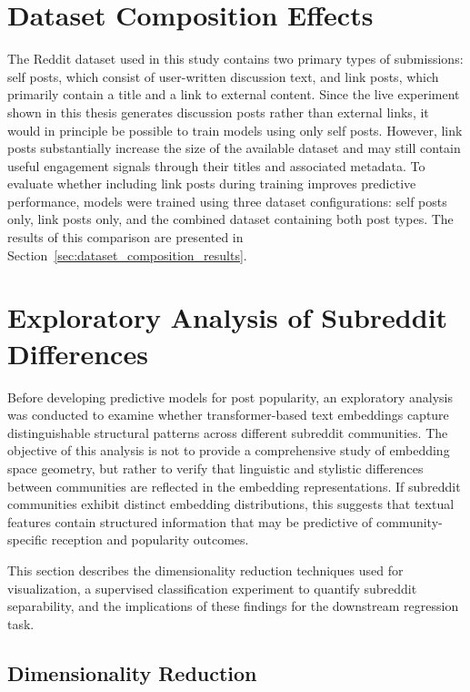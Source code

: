 \section{Dataset Composition Effects}

The Reddit dataset used in this study contains two primary types of submissions: self posts, which consist of user-written discussion text, and link posts, which primarily contain a title and a link to external content. Since the live experiment shown in this thesis generates discussion posts rather than external links, it would in principle be possible to train models using only self posts.
However, link posts substantially increase the size of the available dataset and may still contain useful engagement signals through their titles and associated metadata. To evaluate whether including link posts during training improves predictive performance, models were trained using three dataset configurations: self posts only, link posts only, and the combined dataset containing both post types. The results of this comparison are presented in Section~\ref{sec:dataset_composition_results}.

\section{Exploratory Analysis of Subreddit Differences}
\label{sec:exploratory_analysis}

Before developing predictive models for post popularity, an exploratory analysis was conducted to examine whether transformer-based text embeddings capture distinguishable structural patterns across different subreddit communities. The objective of this analysis is not to provide a comprehensive study of embedding space geometry, but rather to verify that linguistic and stylistic differences between communities are reflected in the embedding representations. If subreddit communities exhibit distinct embedding distributions, this suggests that textual features contain structured information that may be predictive of community-specific reception and popularity outcomes.

This section describes the dimensionality reduction techniques used for visualization, a supervised classification experiment to quantify subreddit separability, and the implications of these findings for the downstream regression task.

\subsection{Dimensionality Reduction}

